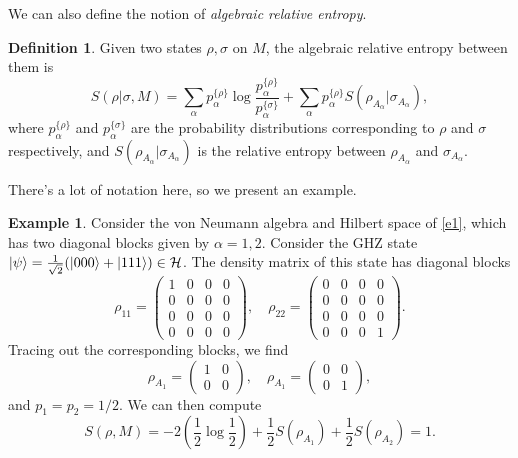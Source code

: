 \documentclass[12pt,a4paper]{report}
\numberwithin{equation}{section}
\theoremstyle{definition}
\newtheorem{definition}{Definition}[section]
\theoremstyle{theorem}
\theoremstyle{theorem}
\theoremstyle{example}
\newtheorem{example}{Example}[section]
\theoremstyle{definition}
\begin{document}
We can also define the notion of \textit{algebraic relative entropy}.
\begin{definition}
	Given two states $\rho,\sigma$ on $M$, the algebraic relative entropy between them is
	\begin{equation}
		S(\rho|\sigma,M)=\sum_{\alpha}p_{\alpha}^{\{\rho\}}\log\frac{p_{\alpha}^{\{\rho\}}}{p_{\alpha}^{\{\sigma\}}}+\sum_{\alpha}p_{\alpha}^{\{\rho\}}S(\rho_{A_{\alpha}}|\sigma_{A_{\alpha}}),
	\end{equation}
	where $p_{\alpha}^{\{\rho\}}$ and $p_{\alpha}^{\{\sigma\}}$ are the probability distributions corresponding to $\rho$ and $\sigma$ respectively, and $S(\rho_{A_{\alpha}}|\sigma_{A_{\alpha}})$ is the relative entropy between $\rho_{A_{\alpha}}$ and $\sigma_{A_{\alpha}}$.
\end{definition}
There's a lot of notation here, so we present an example.
\begin{example}
	Consider the von Neumann algebra and Hilbert space of \ref{e1}, which has two diagonal blocks given by $\alpha=1,2$. Consider the GHZ state $\ket{\psi}=\frac{1}{\sqrt{2}}(\ket{000}+\ket{111})\in\mathcal{H}$. The density matrix of this state has diagonal blocks
	\begin{equation}
		\rho_{11}=\begin{pmatrix}
			1&0&0&0\\
			0&0&0&0\\
			0&0&0&0\\
			0&0&0&0
		\end{pmatrix},\quad\rho_{22}=\begin{pmatrix}
		0&0&0&0\\
		0&0&0&0\\
		0&0&0&0\\
		0&0&0&1
	\end{pmatrix}.
	\end{equation}
	Tracing out the corresponding blocks, we find
	\begin{equation}
		\rho_{A_{1}}=\begin{pmatrix}1&0\\0&0\end{pmatrix},\quad\rho_{A_{1}}=\begin{pmatrix}0&0\\0&1\end{pmatrix},
	\end{equation}
	and $p_{1}=p_{2}=1/2$. We can then compute
	\begin{equation}
		S(\rho,M)=-2\left(\frac{1}{2}\log\frac{1}{2}\right)+\frac{1}{2}S(\rho_{A_{1}})+\frac{1}{2}S(\rho_{A_{2}})=1.
	\end{equation}
\end{example}
\end{document}
